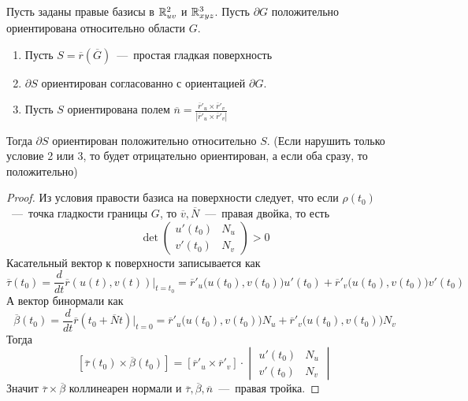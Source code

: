 \begin{lemma}
Пусть заданы правые базисы в $\mathbb{R}^2_{uv}$ и $\mathbb{R}^3_{xyz}$. Пусть $\partial G$ положительно ориентирована относительно области $G$.\begin{enumerate}
    \item Пусть $S = \overline{r}(\overline{G})$~---~простая гладкая поверхность
    \item $\partial S$ ориентирован согласованно с ориентацией $\partial G$.
    \item Пусть $S$ ориентирована полем $\overline{n} = \frac{\overline{r}'_u \times \overline{r}'_v}{|\overline{r}'_u \times \overline{r}'_v|}$
\end{enumerate}  
    Тогда $\partial S$ ориентирован положительно относительно $S$. (Если нарушить только условие 2 или 3, то будет отрицательно ориентирован, а если оба сразу, то положительно)
\end{lemma}
\begin{proof}
    Из условия правости базиса на поверхности следует, что если $\rho(t_0)$~---~точка гладкости границы $G$, то $\overline{v}, \overline{N}$~---~правая двойка, то есть \[
        \det \begin{pmatrix}
            u'(t_0) & N_u \\ v'(t_0) & N_v
        \end{pmatrix} > 0
    \]
    Касательный вектор к поверхности записывается как \[\overline{\tau}(t_0) = \dfrac{d}{dt} \overline{r}(u(t), v(t))|_{t = t_0} = \overline{r}'_u \Big(u(t_0), v(t_0)\Big)u'(t_0) + \overline{r}'_v \Big(u(t_0), v(t_0) \Big)v'(t_0)\]
    А вектор бинормали как \[\overline{\beta}(t_0) = \dfrac{d}{dt} \overline{r}(t_0 + \overline{N}t)|_{t = 0} = \overline{r}'_u \Big(u(t_0), v(t_0)\Big)N_u + \overline{r}'_v \Big(u(t_0), v(t_0)\Big)N_v\]
    Тогда \[ [\overline{\tau}(t_0) \times \overline{\beta}(t_0)] = [\overline{r}'_u \times \overline{r}'_v] \cdot \begin{vmatrix}
        u'(t_0) & N_u \\ v'(t_0) & N_v
    \end{vmatrix}\]
    Значит $\overline{\tau} \times \overline{\beta}$ коллинеарен нормали и $\overline{\tau}, \overline{\beta}, \overline{n}$~---~правая тройка.
\end{proof}
